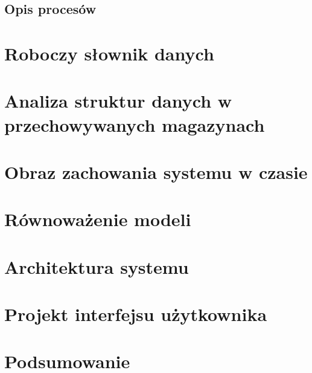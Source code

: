 \documentclass[paper=a4, fontsize=12pt]{scrartcl}
\numberwithin{equation}{section}		%
\numberwithin{figure}{section}			%
\numberwithin{table}{section}				%
\begin{document}
	\subsection{Opis procesów}
		

\section{Roboczy słownik danych}
	
	
\section{Analiza struktur danych w przechowywanych magazynach}
	

\section{Obraz zachowania systemu w czasie}
	
	
\section{Równoważenie modeli}
	

\section{Architektura systemu}
	

\section{Projekt interfejsu użytkownika}
	

\section{Podsumowanie}
\end{document}
